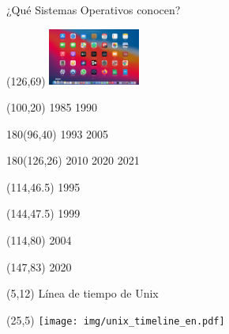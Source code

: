 \documentclass[aspectratio=169]{beamer}
\begin{document}
\begin{frame}{¿Qué Sistemas Operativos conocen?}
    \begin{textblock}{80}(126,69) \includegraphics[width=3cm]{img/macos-10_2020.jpg} \end{textblock}
    \begin{textblock}{80}(100,20) 1985 \hspace{2.3cm} 1990 \end{textblock}
    \begin{textblock}{180}(96,40) 1993 \hspace{0.7cm} 2005 \end{textblock}
    \begin{textblock}{180}(126,26) 2010 \hspace{0.3cm} 2020 \hspace{0.2cm} 2021 \end{textblock}
    \begin{textblock}{80}(114,46.5) 1995 \end{textblock}
    \begin{textblock}{80}(144,47.5) 1999 \end{textblock}
    \begin{textblock}{80}(114,80) 2004 \end{textblock}
    \begin{textblock}{80}(147,83) 2020 \end{textblock}
\end{frame}

\begin{frame}[plain]
    \begin{textblock}{80}(5,12)
    \textcolor{naranjauca}{\Large Línea de tiempo de Unix}
    \end{textblock}
    \begin{textblock}{80}(25,5)
    \texttt{[image: img/unix\_timeline\_en.pdf]}
    \end{textblock}
\end{frame}
\end{document}
